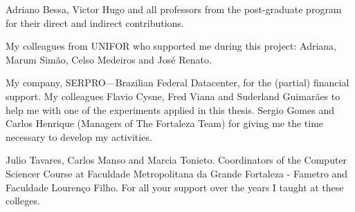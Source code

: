 Adriano Bessa, Victor Hugo and all professors from the post-graduate program for their direct and indirect contributions.

My colleagues from UNIFOR who supported me during this project: Adriana, Marum Simão, Celso Medeiros and José Renato. 

My company, SERPRO—Brazilian Federal Datacenter, for the (partial) financial support. My colleagues  Flavio Cysne, Fred Viana and Suderland Guimarães to help me with one of the experiments applied in this thesis. Sergio Gomes and Carlos Henrique (Managers of The Fortaleza Team) for giving me the time necessary to develop my activities.

Julio Tavares, Carlos Manso and Marcia Tonieto. Coordinators of the Computer Sciencer Course at
Faculdade Metropolitana da Grande Fortaleza - Fametro and Faculdade Lourenço Filho. For all your support over the years I taught at these colleges.

